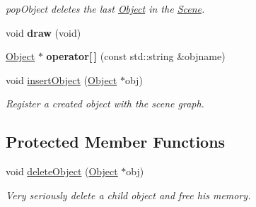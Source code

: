 \begin{DoxyCompactItemize}
\begin{DoxyCompactList}\small\item\em pop\-Object deletes the last \hyperlink{class_object}{Object} in the \hyperlink{class_scene}{Scene}. \end{DoxyCompactList}\item 
\hypertarget{class_scene_a41fbbe388ea322df338648e66611ffcf}{void {\bfseries draw} (void)}\label{class_scene_a41fbbe388ea322df338648e66611ffcf}

\item 
\hypertarget{class_scene_ae9b69d8db8a46991017635f22e45baad}{\hyperlink{class_object}{Object} $\ast$ {\bfseries operator\mbox{[}$\,$\mbox{]}} (const std\-::string \&objname)}\label{class_scene_ae9b69d8db8a46991017635f22e45baad}

\item 
void \hyperlink{class_scene_a8893899f0088a72642ae32a656252e7f}{insert\-Object} (\hyperlink{class_object}{Object} $\ast$obj)
\begin{DoxyCompactList}\small\item\em Register a created object with the scene graph. \end{DoxyCompactList}\end{DoxyCompactItemize}
\subsection*{Protected Member Functions}
\begin{DoxyCompactItemize}
\item 
void \hyperlink{class_scene_ad3897f8ac658af62c133783b2c4eaee4}{delete\-Object} (\hyperlink{class_object}{Object} $\ast$obj)
\begin{DoxyCompactList}\small\item\em Very seriously delete a child object and free his memory. \end{DoxyCompactList}\end{DoxyCompactItemize}
